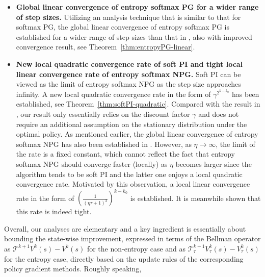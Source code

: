 \begin{itemize}
    \item \textbf{Global linear convergence of entropy softmax PG for a wider range of step sizes.}  Utilizing an analysis technique that is similar to that for softmax PG, the global linear convergence of entropy softmax PG is established for a wider range of step sizes than that in \cite{Mei_Xiao_Szepesvari_Schuurmans_2020}, also with improved convergence result, see Theorem~\ref{thm:entropyPG-linear}.
    \item \textbf{New local quadratic convergence rate of soft PI and tight local linear convergence rate of entropy softmax NPG.}
    Soft PI can be viewed as the limit of entropy softmax NPG as the step size approaches infinity. A new local quadratic convergence rate in  the  form of $\gamma^{\displaystyle 2^{ k-k_0}}$ has been established, see Theorem~\ref{thm:softPI-quadratic}. Compared with the result in \cite{Cen_Cheng_Chen_Wei_Chi_2022}, our result only essentially relies on the discount factor $\gamma$ and does not require an additional assumption on the stationary distribution under the optimal policy. As mentioned earlier, the global linear convergence of entropy softmax NPG has also been established in \cite{Cen_Cheng_Chen_Wei_Chi_2022}. However, as $\eta\rightarrow\infty$, the limit of the rate is a fixed constant, which cannot reflect the fact that entropy softmax NPG should converge faster (locally) as $\eta$ becomes larger since the algorithm tends to be soft PI and the latter one enjoys a local quadratic convergence rate. Motivated by this observation, a local linear convergence rate in the form of $\left(\frac{1}{(\eta\tau+1)^2}\right)^{k-k_0}$ is established. It is meanwhile shown that this rate is indeed tight.

\end{itemize}
Overall, our analyses are elementary and a key ingredient is  essentially about bounding the state-wise improvement, expressed in terms of the Bellman operator as $\mathcal{T}^{k+1}V^k(s)-V^k(s)$ for the non-entropy case and as $\mathcal{T}_\tau^{k+1}V_\tau^k(s)-V_\tau^k(s)$ for the entropy case, directly based on the update rules of the corresponding policy gradient methods. Roughly speaking,
